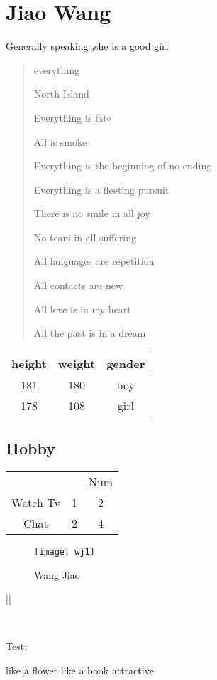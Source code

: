 \documentclass[11pt,a4paper,twoside]{article}
\begin{document}
\newpage
\section{Jiao Wang}
\raggedright Generally speaking ,she is a good girl
\begin{quotation}
everything

North Island

Everything is fate

All is smoke

Everything is the beginning of no ending

Everything is a fleeting pursuit

There is no smile in all joy

No tears in all suffering

All languages are repetition

All contacts are new

All love is in my heart

All the past is in a dream
\end{quotation}
\begin{tabular}{|c|c|c|}
  \hline
  height & weight& gender \\
  \hline
  181 & 180 & boy \\
  \hline
  178 & 108 & girl \\
  \hline
\end{tabular}
\subsection{Hobby}
\begin{tabular}{ccc}
  \hline
    &   & Num \\
  Watch Tv & 1 & 2 \\
  Chat & 2 & 4 \\
  \hline
\end{tabular}
\begin{figure}
  \centering
  \graphicspath{{picture/}}
  \texttt{[image: wj1]}
  \caption{Wang Jiao}
  \label{Girl}
\end{figure}

|| \\
\par
\setlength{\fboxrule}{1.6pt}\
\setlength{\fboxsep}{3em}
\par
Test:\parbox[t]{10em}%
{like a flower   like a book attractive}
\end{document}
